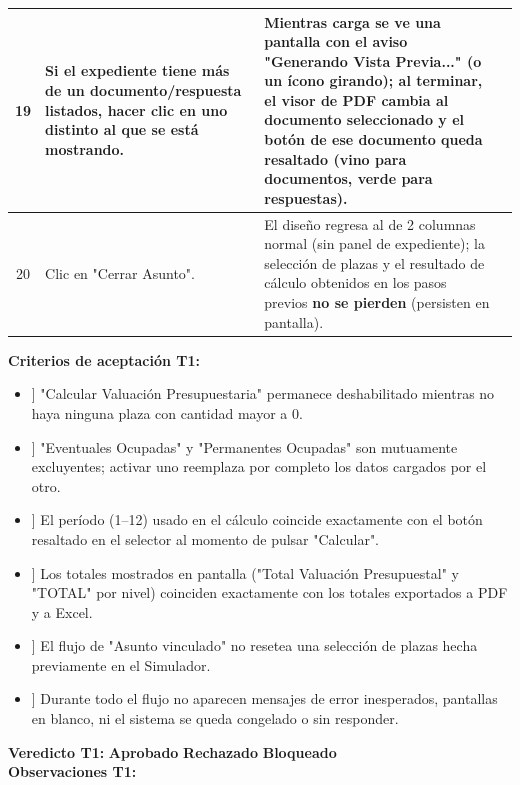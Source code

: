 \documentclass[11pt]{article}
\newcommand{\chk}[1]{\CheckBox[name=#1,width=11pt,height=11pt,bordercolor=grisborde,backgroundcolor=1 1 1]{}}
\begin{document}
\begin{Form}
\begin{longtable}{|c|p{6.7cm}|p{6.7cm}|c|}
19 &
Si el expediente tiene más de un documento/respuesta listados, hacer clic en uno distinto al que
se está mostrando. &
Mientras carga se ve una pantalla con el aviso "Generando Vista Previa..." (o un ícono girando);
al terminar, el visor de PDF cambia al documento seleccionado y el botón de ese documento queda
resaltado (vino para documentos, verde para respuestas). &
\chk{t1r19} \\ \hline

20 &
Clic en "Cerrar Asunto". &
El diseño regresa al de 2 columnas normal (sin panel de expediente); la selección de plazas y el
resultado de cálculo obtenidos en los pasos previos \textbf{no se pierden} (persisten en pantalla). &
\chk{t1r20} \\ \hline

\end{longtable}
\endgroup

\noindent\textbf{Criterios de aceptación T1:}
\begin{itemize}[leftmargin=1.6em]
  \item[\chk{t1ac1}] "Calcular Valuación Presupuestaria" permanece deshabilitado mientras no haya
    ninguna plaza con cantidad mayor a 0.
  \item[\chk{t1ac2}] "Eventuales Ocupadas" y "Permanentes Ocupadas" son mutuamente excluyentes;
    activar uno reemplaza por completo los datos cargados por el otro.
  \item[\chk{t1ac3}] El período (1--12) usado en el cálculo coincide exactamente con el botón
    resaltado en el selector al momento de pulsar "Calcular".
  \item[\chk{t1ac4}] Los totales mostrados en pantalla ("Total Valuación Presupuestal" y "TOTAL"
    por nivel) coinciden exactamente con los totales exportados a PDF y a Excel.
  \item[\chk{t1ac5}] El flujo de "Asunto vinculado" no resetea una selección de plazas hecha
    previamente en el Simulador.
  \item[\chk{t1ac6}] Durante todo el flujo no aparecen mensajes de error inesperados, pantallas en
    blanco, ni el sistema se queda congelado o sin responder.
\end{itemize}

\vspace{6pt}\noindent
\textbf{Veredicto T1:}\quad
\chk{t1_aprobado} \textbf{Aprobado} \qquad
\chk{t1_rechazado} \textbf{Rechazado} \qquad
\chk{t1_bloqueado} \textbf{Bloqueado}\\[4pt]
\noindent\textbf{Observaciones T1:}\\[4pt]
\TextField[name=obs_t1, width=16cm, height=1.6cm, multiline=true, bordercolor=grisborde, backgroundcolor=0.97 0.98 1]{}


\end{Form}
\end{document}
